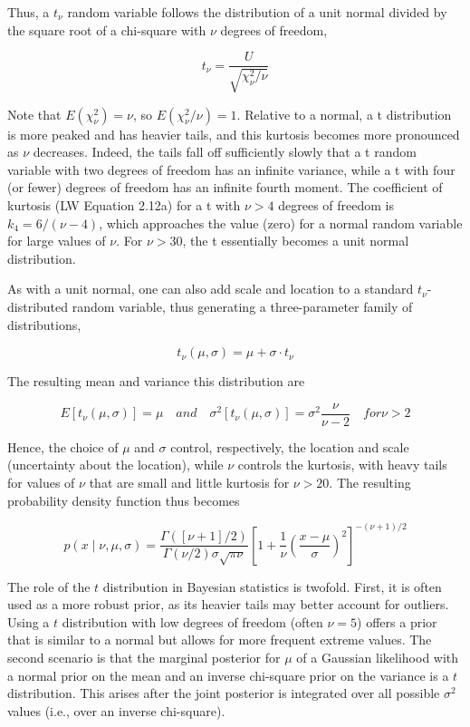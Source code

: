 \documentclass{article}
\begin{document}
Thus, a  $ t_{\nu} $ random variable follows the distribution of a unit normal divided by the square root of a chi-square with  $ \nu $ degrees of freedom,

\begin{equation}
t_{\nu}=\frac{U}{\sqrt{\chi_{\nu}^{2}/\nu}}
\end{equation}

Note that  $ E(\chi_{\nu}^{2}) = \nu $, so  $ E(\chi_{\nu}^{2}/\nu) = 1 $. Relative to a normal, a t distribution is more peaked and has heavier tails, and this kurtosis becomes more pronounced as  $ \nu $ decreases. Indeed, the tails fall off sufficiently slowly that a t random variable with two degrees of freedom has an infinite variance, while a t with four (or fewer) degrees of freedom has an infinite fourth moment. The coefficient of kurtosis (LW Equation 2.12a) for a t with  $ \nu > 4 $ degrees of freedom is  $ k_{4} = 6/(\nu - 4) $, which approaches the value (zero) for a normal random variable for large values of  $ \nu $. For  $ \nu > 30 $, the t essentially becomes a unit normal distribution.

As with a unit normal, one can also add scale and location to a standard  $ t_{\nu} $-distributed random variable, thus generating a three-parameter family of distributions,

\begin{equation}
t_{\nu}(\mu,\sigma)=\mu+\sigma\cdot t_{\nu}
\end{equation}

The resulting mean and variance this distribution are

\begin{equation}
E[t_{\nu}(\mu,\sigma)]=\mu\quad and\quad\sigma^{2}[t_{\nu}(\mu,\sigma)]=\sigma^{2}\frac{\nu}{\nu-2}\quad for\nu>2
\end{equation}

Hence, the choice of  $ \mu $ and  $ \sigma $ control, respectively, the location and scale (uncertainty about the location), while  $ \nu $ controls the kurtosis, with heavy tails for values of  $ \nu $ that are small and little kurtosis for  $ \nu > 20 $. The resulting probability density function thus becomes

\begin{equation}
p(x\mid\nu,\mu,\sigma)=\frac{\Gamma([\nu+1]/2)}{\Gamma(\nu/2)\sigma\sqrt{\pi\nu}}\left[1+\frac{1}{\nu}\left(\frac{x-\mu}{\sigma}\right)^{2}\right]^{-(\nu+1)/2}
\end{equation}

The role of the $t$ distribution in Bayesian statistics is twofold. First, it is often used as a more robust prior, as its heavier tails may better account for outliers. Using a $t$ distribution with low degrees of freedom (often $\nu = 5$) offers a prior that is similar to a normal but allows for more frequent extreme values. The second scenario is that the marginal posterior for $\mu$ of a Gaussian likelihood with a normal prior on the mean and an inverse chi-square prior on the variance is a $t$ distribution. This arises after the joint posterior is integrated over all possible $\sigma^{2}$ values (i.e., over an inverse chi-square).
\end{document}
